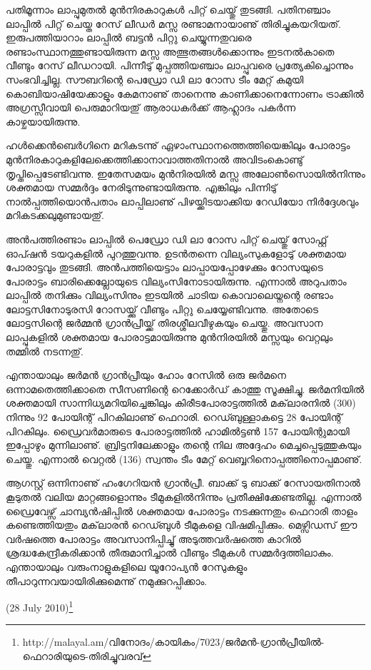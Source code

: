 പതിമൂന്നാം ലാപ്പുമുതല്‍ മുന്‍നിരകാറുകള്‍ പിറ്റ് ചെയ്തു് തുടങ്ങി. പതിനഞ്ചാം ലാപ്പില്‍ പിറ്റ് ചെയ്ത റേസ് ലീഡര്‍ മസ്സ 
രണ്ടാമനായാണു് തിരിച്ചുകയറിയത്. ഇരുപത്തിയാറാം ലാപ്പില്‍ ബട്ടന്‍ പിറ്റു ചെയ്യുന്നതുവരെ രണ്ടാംസ്ഥാനത്തുണ്ടായിരുന്ന 
മസ്സ അത്ഭുതങ്ങള്‍ക്കൊന്നും ഇടനല്‍കാതെ വീണ്ടും റേസ് ലീഡറായി. പിന്നീടു് മുപ്പത്തിയഞ്ചാം 
ലാപ്പുവരെ പ്രത്യേകിച്ചൊന്നും സംഭവിച്ചില്ല. സൗബറിന്റെ പെഡ്രോ ഡി ലാ റോസ ടീം മേറ്റ് കമുയി 
കൊബിയാഷിയേക്കാളും കേമനാണു് താനെന്നു കാണിക്കാനെന്നോണം ട്രാക്കില്‍ അഗ്രസ്സീവായി പെരുമാറിയതു് 
ആരാധകര്‍ക്ക് ആഹ്ലാദം പകര്‍ന്ന കാഴ്ചയായിരുന്നു.

ഹള്‍ക്കെന്‍ബെര്‍ഗിനെ മറികടന്നു് ഏഴാംസ്ഥാനത്തെത്തിയെങ്കിലും പോരാട്ടം 
മുന്‍നിരകാറുകളിലേക്കെത്തിക്കാനാവാത്തതിനാല്‍ അവിടംകൊണ്ടു് തൃപ്തിപ്പെടേണ്ടിവന്നു. ഇതേസമയം മുന്‍നിരയില്‍ 
മസ്സ അലോണ്‍സൊയില്‍നിന്നും ശക്തമായ സമ്മര്‍ദ്ദം നേരിടുന്നുണ്ടായിരുന്നു. എങ്കിലും പിന്നിടു് നാല്‍പ്പത്തിയൊന്‍പതാം 
ലാപ്പിലാണു് പിഴയ്ക്കിടയാക്കിയ റേഡിയോ നിര്‍ദ്ദേശവും മറികടക്കലുമുണ്ടായതു്.

അന്‍പത്തിരണ്ടാം ലാപ്പില്‍ പെഡ്രോ ഡി ലാ റോസ പിറ്റ് ചെയ്തു് സോഫ്റ്റ് ഓപ്ഷന്‍ ടയറുകളില്‍ പുറത്തുവന്നു. ഉടന്‍തന്നെ 
വില്യംസുകളോടു് ശക്തമായ പോരാട്ടവും തുടങ്ങി. അന്‍പത്തിയെട്ടാം ലാപ്പായപ്പോഴേക്കും റോസയുടെ പോരാട്ടം 
ബാരിക്കെല്ലോയുടെ വില്യംസിനോടായിരുന്നു. എന്നാല്‍ അറുപതാം ലാപ്പില്‍ തനിക്കും വില്യംസിനും ഇടയില്‍ ചാടിയ 
കൊവാലെയ്നന്റെ രണ്ടാം ലോട്ടസിനോടുരസി റോസയ്ക്കു് വീണ്ടും പിറ്റു ചെയ്യേണ്ടിവന്നു. അതോടെ ലോട്ടസിന്റെ ജര്‍മ്മന്‍ 
ഗ്രാന്‍പ്രീയ്ക്ക് തിരശ്ശീലവീഴുകയും ചെയ്തു. അവസാന ലാപ്പുകളില്‍ ശക്തമായ പോരാട്ടമായിരുന്നു മുന്‍നിരയില്‍ മസ്സയും 
വെറ്റലും തമ്മില്‍ നടന്നതു്.

എന്തായാലും ജര്‍മന്‍ ഗ്രാന്‍പ്രീയും ഹോം റേസില്‍ ഒരു ജര്‍മനെ ഒന്നാമതെത്തിക്കാതെ സീസണിന്റെ റെക്കോര്‍ഡ് കാത്തു 
സൂക്ഷിച്ചു. ജര്‍മനിയില്‍ ശക്തമായി സാന്നിധ്യമറിയിച്ചെങ്കിലും കിരീടപോരാട്ടത്തില്‍ മക്‌ലാരനില്‍ (300) നിന്നും 92 
പോയിന്റ് പിറകിലാണു് ഫെറാരി. റെഡ്ബുള്ളാകട്ടെ 28 പോയിന്റ് പിറകിലും. ഡ്രൈവര്‍മാരുടെ പോരാട്ടത്തില്‍ 
ഹാമില്‍ട്ടണ്‍ 157 പോയിന്റുമായി ഇപ്പോഴും മുന്നിലാണു്. ബ്രിട്ടനിലേക്കാളും തന്റെ നില അദ്ദേഹം മെച്ചപ്പെടുത്തുകയും 
ചെയ്തു. എന്നാല്‍ വെറ്റല്‍ (136) സ്വന്തം ടീം മേറ്റ് വെബ്ബറിനൊപ്പത്തിനൊപ്പമാണു്.

ആഗസ്റ്റ് ഒന്നിനാണു് ഹംഗേറിയന്‍ ഗ്രാന്‍പ്രീ. ബാക്ക് ടു ബാക്ക് റേസായതിനാല്‍ കൂടുതല്‍ വലിയ മാറ്റങ്ങളൊന്നും 
ടീമുകളില്‍നിന്നും പ്രതീക്ഷിക്കേണ്ടതില്ല. എന്നാല്‍ ഡ്രൈവേഴ്സ് ചാമ്പ്യന്‍ഷിപ്പില്‍ ശക്തമായ പോരാട്ടം നടക്കുന്നതും ഫെറാരി 
താളം കണ്ടെത്തിയതും മക്‌ലാരന്‍ റെഡ്ബുള്‍ ടീമുകളെ വിഷമിപ്പിക്കും. മെഴ്സിഡസ് ഈ വര്‍ഷത്തെ പോരാട്ടം 
അവസാനിപ്പിച്ചു് അടുത്തവര്‍ഷത്തെ കാറില്‍ ശ്രദ്ധകേന്ദ്രീകരിക്കാന്‍ തീരുമാനിച്ചാല്‍ വീണ്ടും ടീമുകള്‍ സമ്മര്‍ദ്ദത്തിലാകും.
എന്തായാലും വരുംനാളുകളിലെ യൂറോപ്യന്‍ റേസുകളും തീപാറുന്നവയായിരിക്കുമെന്നു് നമുക്കുറപ്പിക്കാം.

(28 July 2010)\footnote{http://malayal.am/വിനോദം/കായികം/7023/ജര്‍മന്‍-ഗ്രാന്‍പ്രീയില്‍-ഫെറാരിയുടെ-തിരിച്ചുവരവ്}

\newpage
